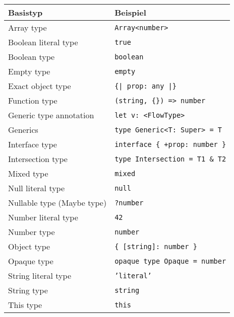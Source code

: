 \begin{table}
  \begin{tabularx}{\textwidth}{@{}ll@{}}
    \midrule
    \textbf{Basistyp}         & \textbf{Beispiel}                        \\
    \midrule
    Array type                 & \texttt{Array<{}number>{}}               \\
    Boolean literal type       & \texttt{true}                            \\
    Boolean type               & \texttt{boolean}                         \\
    Empty type                 & \texttt{empty}                           \\
    Exact object type          & \texttt{\{| prop: any |\}}               \\
    Function type              & \texttt{(string, \{\}) => number}        \\
    Generic type annotation    & \texttt{let v: <{}FlowType>{}}           \\
    Generics                   & \texttt{type Generic<{}T: Super> = T}    \\
    Interface type             & \texttt{interface \{ +prop: number \}}   \\
    Intersection type          & \texttt{type Intersection = T1 \& T2}    \\
    Mixed type                 & \texttt{mixed}                           \\
    Null literal type          & \texttt{null}                            \\
    Nullable type (Maybe type) & \texttt{?number}                         \\
    Number literal type        & \texttt{42}                              \\
    Number type                & \texttt{number}                          \\
    Object type                & \texttt{\{ {[}string{]}: number \}}      \\
    Opaque type                & \texttt{opaque type Opaque = number}     \\
    String literal type        & \texttt{'literal'}                       \\
    String type                & \texttt{string}                          \\
    This type                  & \texttt{this}                            \\

\end{tabularx}
\end{table}
